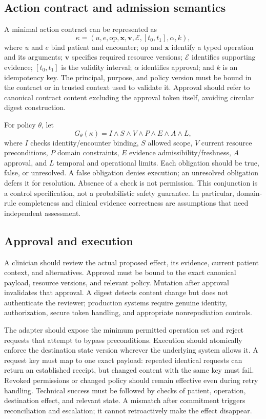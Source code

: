 \subsection{Action contract and admission semantics}
A minimal action contract can be represented as
\begin{equation}
\kappa=(u,e,\mathrm{op},\mathbf{x},\mathbf{v},\mathcal{E},[t_0,t_1],\alpha,k),
\end{equation}
where $u$ and $e$ bind patient and encounter; $\mathrm{op}$ and $\mathbf{x}$ identify a typed operation and its arguments; $\mathbf{v}$ specifies required resource versions; $\mathcal{E}$ identifies supporting evidence; $[t_0,t_1]$ is the validity interval; $\alpha$ identifies approval; and $k$ is an idempotency key. The principal, purpose, and policy version must be bound in the contract or in trusted context used to validate it. Approval should refer to canonical contract content excluding the approval token itself, avoiding circular digest construction.

For policy $\theta$, let
\begin{equation}
G_\theta(\kappa)=I\wedge S\wedge V\wedge P\wedge E\wedge A\wedge L,
\end{equation}
where $I$ checks identity/encounter binding, $S$ allowed scope, $V$ current resource preconditions, $P$ domain constraints, $E$ evidence admissibility/freshness, $A$ approval, and $L$ temporal and operational limits. Each obligation should be true, false, or unresolved. A false obligation denies execution; an unresolved obligation defers it for resolution. Absence of a check is not permission. This conjunction is a control specification, not a probabilistic safety guarantee. In particular, domain-rule completeness and clinical evidence correctness are assumptions that need independent assessment.

\subsection{Approval and execution}
A clinician should review the actual proposed effect, its evidence, current patient context, and alternatives. Approval must be bound to the exact canonical payload, resource versions, and relevant policy. Mutation after approval invalidates that approval. A digest detects content change but does not authenticate the reviewer; production systems require genuine identity, authorization, secure token handling, and appropriate nonrepudiation controls.

The adapter should expose the minimum permitted operation set and reject requests that attempt to bypass preconditions. Execution should atomically enforce the destination state version wherever the underlying system allows it. A request key must map to one exact payload: repeated identical requests can return an established receipt, but changed content with the same key must fail. Revoked permissions or changed policy should remain effective even during retry handling. Technical success must be followed by checks of patient, operation, destination effect, and relevant state. A mismatch after commitment triggers reconciliation and escalation; it cannot retroactively make the effect disappear.

